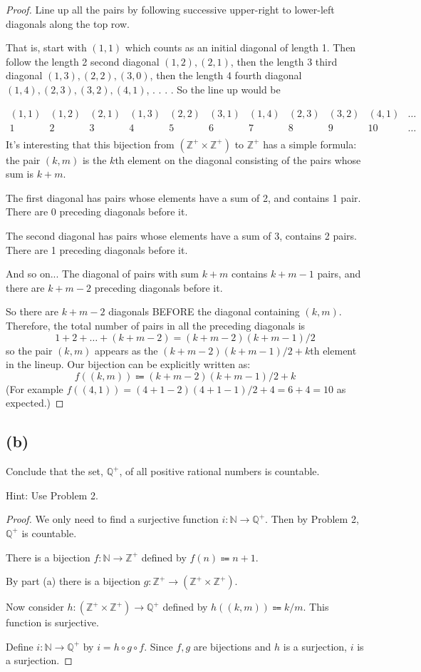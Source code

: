 \documentclass[14pt]{extarticle}
\begin{document}
\begin{proof}
Line up all the pairs by following successive upper-right to lower-left diagonals along the top row.

That is, start with $(1,1)$ which counts as an initial diagonal of length 1. Then follow the length 2 second diagonal $(1,2), (2,1)$, then the length 3 third diagonal $(1,3), (2,2), (3,0)$, then the length 4 fourth diagonal $(1,4), (2,3), (3,2), (4,1)$, . . . . So the line up would be

$$
\begin{array}{ccccccccccc}
(1,1)&(1,2)&(2,1)&(1,3)&(2,2)&(3,1)&(1,4)&(2,3)&(3,2)&(4,1)&\ldots\\
1&2&3&4&5&6&7&8&9&10&\ldots\\
\end{array}
$$
It’s interesting that this bijection from $(\mathbb{Z}^+ \times \mathbb{Z}^+)$ to $\mathbb{Z}^+$ has a simple formula: the pair $(k, m)$ is the $k$th element on the diagonal consisting of the pairs whose sum is $k + m$. 

The first diagonal has pairs whose elements have a sum of 2, and contains 1 pair. There are 0 preceding diagonals before it.

The second diagonal has pairs whose elements have a sum of 3, contains 2 pairs. There are 1 preceding diagonals before it.

And so on... The diagonal of pairs with sum $k+m$ contains $k+m-1$ pairs, and there are $k+m-2$ preceding diagonals before it.

So there are $k+m-2$ diagonals BEFORE the diagonal containing $(k,m)$. Therefore, the total number of pairs in all the preceding diagonals is
$$
1 + 2 + \ldots + (k + m - 2) = (k+m-2)(k+m-1)/2
$$
so the pair $(k, m)$ appears as the $(k+m-2)(k+m-1)/2 + k$th element in the lineup. Our bijection can be explicitly written as:
$$
f((k,m)) \Coloneqq (k+m-2)(k+m-1)/2 + k
$$
(For example $f((4,1)) = (4+1-2)(4+1-1)/2 + 4 = 6 + 4 = 10$ as expected.)
\end{proof}

\subsection{(b)}
Conclude that the set, $\mathbb{Q}^+$, of all positive rational numbers is countable.

Hint: Use Problem 2.
\begin{proof}
We only need to find a surjective function $i: \mathbb{N} \to \mathbb{Q}^+$. Then by Problem 2, $\mathbb{Q}^+$ is countable.

There is a bijection $f: \mathbb{N} \to \mathbb{Z}^+$ defined by $f(n) \Coloneqq n+1$.

By part (a) there is a bijection $g: \mathbb{Z}^+ \to (\mathbb{Z}^+ \times \mathbb{Z}^+)$.

Now consider $h: (\mathbb{Z}^+ \times \mathbb{Z}^+) \to \mathbb{Q}^+$ defined by $h((k, m)) \Coloneqq k / m$. This function is surjective.

Define $i: \mathbb{N} \to \mathbb{Q}^+$ by $i = h \circ g \circ f$. Since $f, g$ are bijections and $h$ is a surjection, $i$ is a surjection.
\end{proof}
\end{document}
